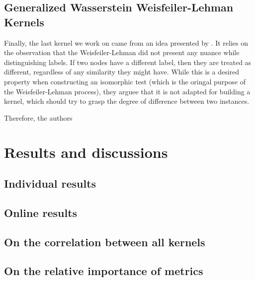 \documentclass{IEEEtran}
\begin{document}
\subsection{Generalized Wasserstein Weisfeiler-Lehman Kernels}
Finally, the last kernel we work on came from an idea presented by
\cite{schulz2022generalized}.
It relies on the observation that the Weisfeiler-Lehman
did not present any nuance while distinguishing labels.
If two nodes have a different label, then they are treated as different,
regardless of any similarity they might have.
While this is a desired property when constructing an
isomorphic test (which is the oringal purpose of the Weisfeiler-Lehman process),
they arguee that it is not adapted for building a kernel, which should try to grasp
the degree of difference between two instances.

Therefore, the authors



\section{Results and discussions}
\subsection{Individual results}
\subsection{Online results}
\subsection{On the correlation between all kernels}
\subsection{On the relative importance of metrics}



\end{document}
